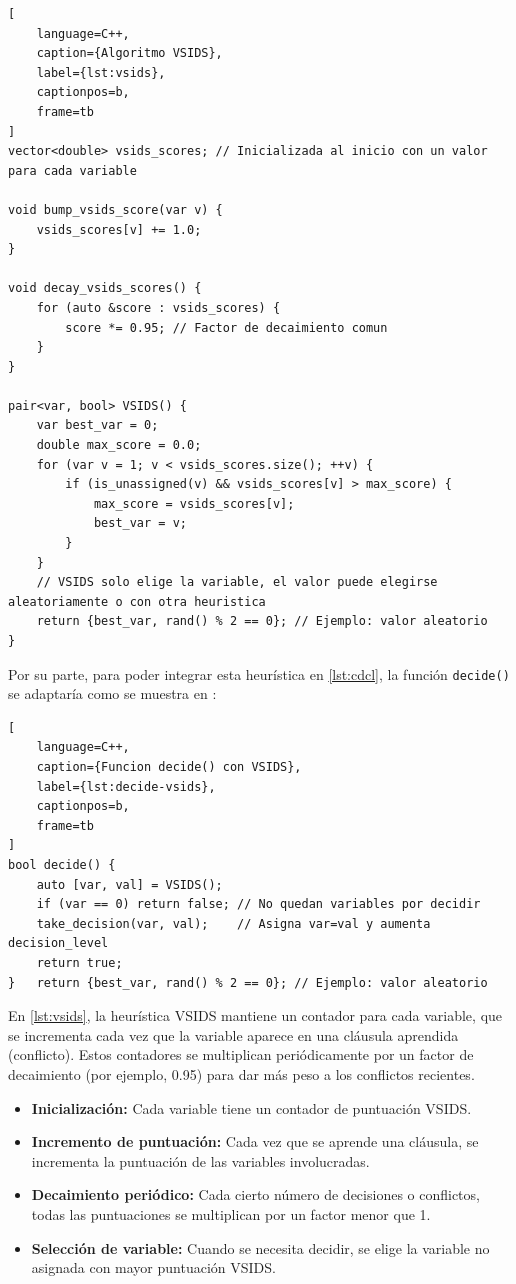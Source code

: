 \begin{lstlisting}[
    language=C++,
    caption={Algoritmo VSIDS},
    label={lst:vsids},
    captionpos=b,
    frame=tb
]
vector<double> vsids_scores; // Inicializada al inicio con un valor para cada variable

void bump_vsids_score(var v) {
    vsids_scores[v] += 1.0;
}

void decay_vsids_scores() {
    for (auto &score : vsids_scores) {
        score *= 0.95; // Factor de decaimiento comun
    }
}

pair<var, bool> VSIDS() {
    var best_var = 0;
    double max_score = 0.0;
    for (var v = 1; v < vsids_scores.size(); ++v) {
        if (is_unassigned(v) && vsids_scores[v] > max_score) {
            max_score = vsids_scores[v];
            best_var = v;
        }
    }
    // VSIDS solo elige la variable, el valor puede elegirse aleatoriamente o con otra heuristica
    return {best_var, rand() % 2 == 0}; // Ejemplo: valor aleatorio
}

\end{lstlisting}

Por su parte, para poder integrar esta heur\'istica en \ref{lst:cdcl}, la funci\'on \texttt{decide()} se adaptar\'ia como se muestra en :

\begin{lstlisting}[
    language=C++,
    caption={Funcion decide() con VSIDS},
    label={lst:decide-vsids},
    captionpos=b,
    frame=tb
]
bool decide() {
    auto [var, val] = VSIDS();
    if (var == 0) return false; // No quedan variables por decidir
    take_decision(var, val);    // Asigna var=val y aumenta decision_level
    return true;
}   return {best_var, rand() % 2 == 0}; // Ejemplo: valor aleatorio

\end{lstlisting}

En \ref{lst:vsids}, la heurística VSIDS mantiene un contador para cada variable, que se incrementa cada vez que la variable aparece en una cláusula aprendida (conflicto). Estos contadores se multiplican periódicamente por un factor de decaimiento (por ejemplo, 0.95) para dar más peso a los conflictos recientes.

\begin{itemize}
    \item \textbf{Inicialización:} Cada variable tiene un contador de puntuación VSIDS.
    \item \textbf{Incremento de puntuación:} Cada vez que se aprende una cláusula, se incrementa la puntuación de las variables involucradas.
    \item \textbf{Decaimiento periódico:} Cada cierto número de decisiones o conflictos, todas las puntuaciones se multiplican por un factor menor que 1.
    \item \textbf{Selección de variable:} Cuando se necesita decidir, se elige la variable no asignada con mayor puntuación VSIDS.
\end{itemize}

